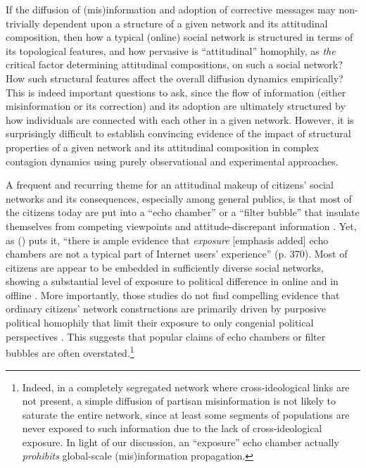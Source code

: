 \documentclass[man, 12pt, a4paper, noextraspace]{apa6}
\begin{document}
  If the diffusion of (mis)information and adoption of corrective messages may non-trivially dependent upon a structure of a given network and its attitudinal composition, then how a typical (online) social network is structured in terms of its topological features, and how pervasive is \enquote{attitudinal} homophily, as \emph{the} critical factor determining attitudinal compositions, on such a social network? How such structural features affect the overall diffusion dynamics empirically? This is indeed important questions to ask, since the flow of information (either misinformation or its correction) and its adoption are ultimately structured by how individuals are connected with each other in a given network. However, it is surprisingly difficult to establish convincing evidence of the impact of structural properties of a given network and its attitudinal composition in complex contagion dynamics using purely observational and experimental approaches.
    
    A frequent and recurring theme for an attitudinal makeup of citizens' social networks and its consequences, especially among general publics, is that most of the citizens today are put into a \enquote{echo chamber} or a \enquote{filter bubble} that insulate themselves from competing viewpoints and attitude-discrepant information \parencite[e.g.,][]{lewandowsky2017beyond, del2016spreading}. Yet, as \citeauthor{Garrett2017distraction} (\citeyear{Garrett2017distraction}) puts it, \enquote{there is ample evidence that \emph{exposure} [emphasis added] echo chambers are not a typical part of Internet users' experience} (p. 370). Most of citizens are appear to be embedded in sufficiently diverse social networks, showing a substantial level of exposure to political difference in online \parencite[e.g.,][]{Bakshy1130, messing2014selective} and in offline \parencite[e.g.,][]{huckfeldt2004disagreement}. More importantly, those studies do not find compelling evidence that ordinary citizens' network constructions are primarily driven by purposive political homophily that limit their exposure to only congenial political perspectives \parencite{song2015uncovering, lazer2010coevolution}. This suggests that popular claims of echo chambers or filter bubbles are often overstated.\footnote{    Indeed, in a completely segregated network where cross-ideological links are not present, a simple diffusion of partisan misinformation is not likely to saturate the entire network, since at least some segments of populations are never exposed to such information due to the lack of cross-ideological exposure. In light of our discussion, an \enquote{exposure} echo chamber actually \emph{prohibits} global-scale (mis)information propagation.} 
    
\end{document}
